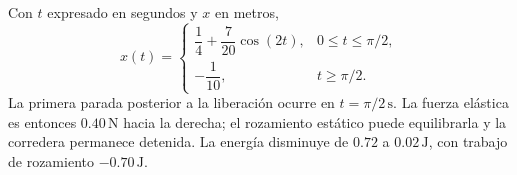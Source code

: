 Con \(t\) expresado en segundos y \(x\) en metros,
\[
x(t)=
\begin{cases}
\dfrac14+\dfrac7{20}\cos(2t),&0\le t\le\pi/2,\\[2pt]
-\dfrac1{10},&t\ge\pi/2.
\end{cases}
\]
La primera parada posterior a la liberación ocurre en \(t=\pi/2\,\mathrm s\). La fuerza elástica es entonces \(0.40\,\mathrm N\) hacia la derecha; el rozamiento estático puede equilibrarla y la corredera permanece detenida. La energía disminuye de \(0.72\) a \(0.02\,\mathrm J\), con trabajo de rozamiento \(-0.70\,\mathrm J\).
